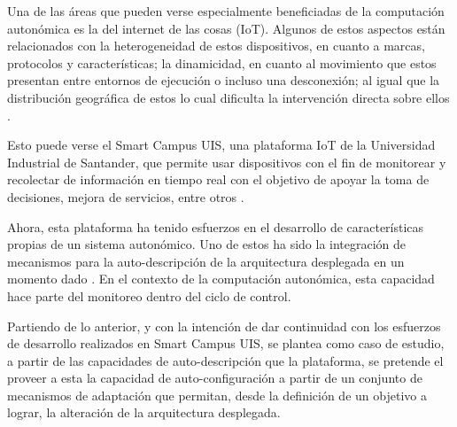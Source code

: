 \documentclass[12pt]{article}
\begin{document}



    Una de las áreas que pueden verse especialmente beneficiadas de la computación autonómica es la del internet de las cosas (IoT). Algunos de estos aspectos están relacionados con la heterogeneidad de estos dispositivos, en cuanto a marcas, protocolos y características; la dinamicidad, en cuanto al movimiento que estos presentan entre entornos de ejecución o incluso una desconexión; al igual que la distribución geográfica de estos lo cual dificulta la intervención directa sobre ellos \cite{Tahir_2019}. 
    
    Esto puede verse el Smart Campus UIS, una plataforma IoT de la Universidad Industrial de Santander, que permite usar dispositivos con el fin de monitorear y recolectar de información en tiempo real con el objetivo de apoyar la toma de decisiones, mejora de servicios, entre otros \cite{henry_2020}.

    Ahora, esta plataforma ha tenido esfuerzos en el desarrollo de características propias de un sistema autonómico. Uno de estos ha sido la integración de mecanismos para la auto-descripción de la arquitectura desplegada en un momento dado \cite{msc_henry_2022}. En el contexto de la computación autonómica, esta capacidad hace parte del monitoreo dentro del ciclo de control. 
    

    Partiendo de lo anterior, y con la intención de dar continuidad con los esfuerzos de desarrollo realizados en Smart Campus UIS, se plantea como caso de estudio, a partir de las capacidades de auto-descripción que la plataforma, se pretende el proveer a esta la capacidad de auto-configuración a partir de un conjunto de mecanismos de adaptación que permitan, desde la definición de un objetivo a lograr, la alteración de la arquitectura desplegada. 
\end{document}
